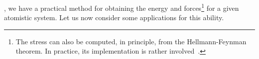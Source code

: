 , we have a practical method for obtaining the energy and forces\footnote[][-1\baselineskip]{The stress can also be computed, in principle, from the Hellmann-Feynman theorem. In practice, its implementation is rather involved~\cite{kcbs2015t}.} for a given atomistic system. Let us now consider some applications for this ability.





